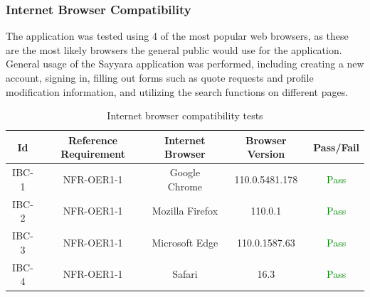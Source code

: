 \documentclass[12pt, titlepage]{article}
\begin{document}
\subsubsection{Internet Browser Compatibility}
The application was tested using 4 of the most popular web browsers, as these are the most likely browsers the general public would use for the application. General usage of the Sayyara application was performed, including creating a new account, signing in, filling out forms such as quote requests and profile modification information, and utilizing the search functions on different pages.

\begin{table}[H]
    \centering
    \begin{tabularx}{\textwidth}{|c|c|c|c|c|}
        \hline
        Id & Reference Requirement & Internet Browser & Browser Version & Pass/Fail\\ \hline
        IBC-1 & NFR-OER1-1 & Google Chrome & 110.0.5481.178 & \textcolor{green}{Pass} \\ \hline
        IBC-2 & NFR-OER1-1 & Mozilla Firefox & 110.0.1 & \textcolor{green}{Pass}\\ \hline
        IBC-3 & NFR-OER1-1 & Microsoft Edge & 110.0.1587.63 & \textcolor{green}{Pass} \\ \hline
        IBC-4 & NFR-OER1-1 & Safari & 16.3 & \textcolor{green}{Pass}\\ \hline
    \end{tabularx}
    \caption{Internet browser compatibility tests}
\end{table}


\end{document}

